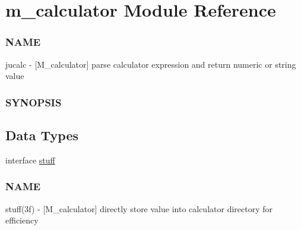 \hypertarget{namespacem__calculator}{}\section{m\+\_\+calculator Module Reference}
\label{namespacem__calculator}


\subsubsection*{N\+A\+ME}

jucalc -\/ \mbox{[}M\+\_\+calculator\mbox{]} parse calculator expression and return numeric or string value \subsubsection*{S\+Y\+N\+O\+P\+S\+IS} 


\subsection*{Data Types}
\begin{DoxyCompactItemize}
\item 
interface \hyperlink{interfacem__calculator_1_1stuff}{stuff}
\begin{DoxyCompactList}\small\item\em \subsubsection*{N\+A\+ME}

stuff(3f) -\/ \mbox{[}M\+\_\+calculator\mbox{]} directly store value into calculator directory for efficiency \end{DoxyCompactList}\end{DoxyCompactItemize}
